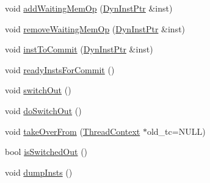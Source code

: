 \begin{DoxyCompactItemize}
\item 
void \hyperlink{classLWBackEnd_a965a423ceedaeb3ec978531621234d0e}{addWaitingMemOp} (\hyperlink{classLWBackEnd_a028ce10889c5f6450239d9e9a7347976}{DynInstPtr} \&inst)
\item 
void \hyperlink{classLWBackEnd_a38f3385718380c23fe08a81063cc37e1}{removeWaitingMemOp} (\hyperlink{classLWBackEnd_a028ce10889c5f6450239d9e9a7347976}{DynInstPtr} \&inst)
\item 
void \hyperlink{classLWBackEnd_a720e9865ffa6e84b756f5ec1d1a24d94}{instToCommit} (\hyperlink{classLWBackEnd_a028ce10889c5f6450239d9e9a7347976}{DynInstPtr} \&inst)
\item 
void \hyperlink{classLWBackEnd_aaf16f1d27dc8f5db83c4d2b981a100a9}{readyInstsForCommit} ()
\item 
void \hyperlink{classLWBackEnd_a05f299b443f8cc73a93d61572edc0218}{switchOut} ()
\item 
void \hyperlink{classLWBackEnd_a039b639c41c289e1cfe6d71c41d9308c}{doSwitchOut} ()
\item 
void \hyperlink{classLWBackEnd_a5a901e7ec5b94a55bd61fde88ad0b7f1}{takeOverFrom} (\hyperlink{classThreadContext}{ThreadContext} $\ast$old\_\-tc=NULL)
\item 
bool \hyperlink{classLWBackEnd_a471165257f311a78136ce991a3bad31a}{isSwitchedOut} ()
\item 
void \hyperlink{classLWBackEnd_a80587b4fe043bbe1995536cb3b361588}{dumpInsts} ()
\end{DoxyCompactItemize}
